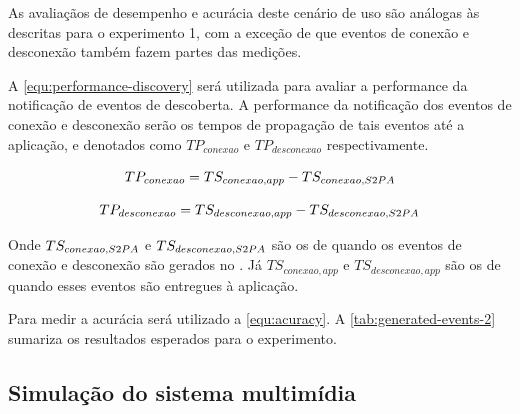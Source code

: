 As avaliaçãos de desempenho e acurácia deste cenário de uso são análogas às descritas para o experimento 1, com a exceção de que eventos de conexão e desconexão também fazem partes das medições.

A \autoref{equ:performance-discovery} será utilizada para avaliar a performance da notificação de eventos de descoberta. A performance da notificação dos eventos de conexão e desconexão serão os tempos de propagação de tais eventos até a aplicação, e denotados como $TP_{conexao}$ e $TP_{desconexao}$ respectivamente.

\begin{equation}
	\label{equ:performance-connection}
	TP_{conexao} = TS_{conexao,app} - TS_{conexao,S2PA{}}
\end{equation}

\begin{equation}
	\label{equ:performance-disconnection}
	TP_{desconexao} = TS_{desconexao,app} - TS_{desconexao,S2PA{}}
\end{equation}

Onde $TS_{conexao,S2PA{}}$ e $TS_{desconexao,S2PA{}}$ são os \timestamps{} de quando os eventos de conexão e desconexão são gerados no \stwopa{}. Já $TS_{conexao,app}$ e $TS_{desconexao,app}$ são os \timestamps{} de quando esses eventos são entregues à aplicação.

Para medir a acurácia será utilizado a \autoref{equ:acuracy}. A \autoref{tab:generated-events-2} sumariza os resultados esperados para o experimento.

\begin{table}[htb]
	\begin{center}
	\end{center}
\end{table}

\subsection{Simulação do sistema multimídia}

